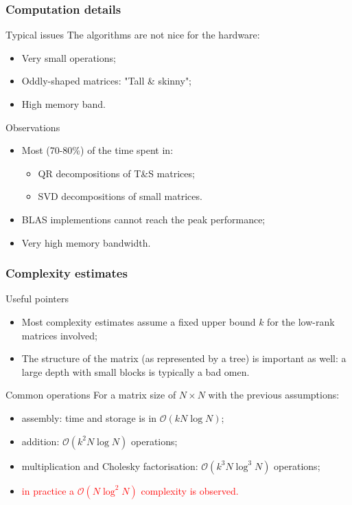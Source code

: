 \begin{frame}
\frametitle{Computation details}
\begin{block}{Typical issues}
The \hmat algorithms are not nice for the hardware:
\begin{itemize}
\item Very small operations; 
\item Oddly-shaped matrices: "Tall \& skinny";
\item High memory band.
\end{itemize}
\end{block}
\begin{block}{Observations}
  \begin{itemize}
    \item Most (70-80\%) of the time spent in: 
    \begin{itemize}
      \item QR decompositions of T\&S matrices; 
      \item SVD decompositions of small matrices.
    \end{itemize}
    \item BLAS implementions cannot reach the peak performance;
    \item Very high memory bandwidth.
  \end{itemize}
\end{block}
\end{frame}

\begin{frame}
\frametitle{Complexity estimates}

\begin{alert}{Useful pointers}
\begin{itemize}
\item Most complexity estimates assume a fixed upper bound $k$ for the 
low-rank matrices involved;
\item The structure of the matrix (as represented by a tree) is 
important as well: a large depth with small blocks is typically a bad omen.
\end{itemize}
\end{alert}

\begin{block}{Common operations}
For a matrix size of $N \times N$ with the previous assumptions:
\begin{itemize}
\item assembly:  time and storage is in $\mathcal{O}(kN \log N)$;
\item addition: $\mathcal{O}(k^2N \log N )$ operations;
\item multiplication and Cholesky factorisation: $\mathcal{O}(k^3 N \log^3 N )$ operations;
\item \textcolor{red}{in practice a $\mathcal{O}(N \log^2 N)$ complexity is observed.}
\end{itemize}
\end{block}

\end{frame}

